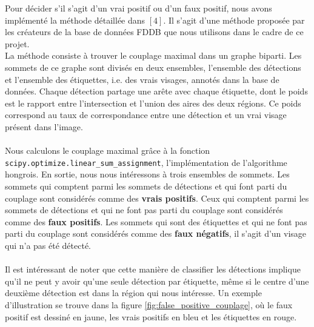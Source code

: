 \documentclass[a4paper,11pt]{article}
\begin{document}
        Pour décider s'il s'agit d'un vrai positif ou d'un faux positif, nous avons implémenté la méthode détaillée dans $[4]$.
        Il s'agit d'une méthode proposée par les créateurs de la base de données FDDB que nous utilisons dans le cadre de ce projet.
        \\
        La méthode consiste à trouver le couplage maximal dans un graphe biparti.
        Les sommets de ce graphe sont divisés en deux ensembles, l'ensemble des détections et l'ensemble des étiquettes, i.e. des vrais visages, annotés dans la base de données.
        Chaque détection partage une arête avec chaque étiquette, dont le poids est le rapport entre l'intersection et l'union des aires des deux régions.
        Ce poids correspond au taux de correspondance entre une détection et un vrai visage présent dans l'image.\\\\
        Nous calculons le couplage maximal grâce à la fonction \verb!scipy.optimize.linear_sum_assignment!, l'implémentation de l'algorithme hongrois.
        En sortie, nous nous intéressons à trois ensembles de sommets. 
        Les sommets qui comptent parmi les sommets de détections et qui font parti du couplage sont considérés comme des {\bf vrais positifs}.
        Ceux qui comptent parmi les sommets de détections et qui ne font pas parti du couplage sont considérés comme des {\bf faux positifs}.
        Les sommets qui sont des étiquettes et qui ne font pas parti du couplage sont considérés comme des {\bf faux négatifs}, il s'agit d'un visage qui n'a pas été détecté.
        \\
        \\
        Il est intéressant de noter que cette manière de classifier les détections implique qu'il ne peut y avoir qu'une seule détection par étiquette, même si le centre d'une deuxième détection est dans la région qui nous intéresse.
        Un exemple d'illustration se trouve dans la figure \ref{fig:false_positive_couplage}, où le faux positif est dessiné en jaune, les vrais positifs en bleu et les étiquettes en rouge.
\end{document}
